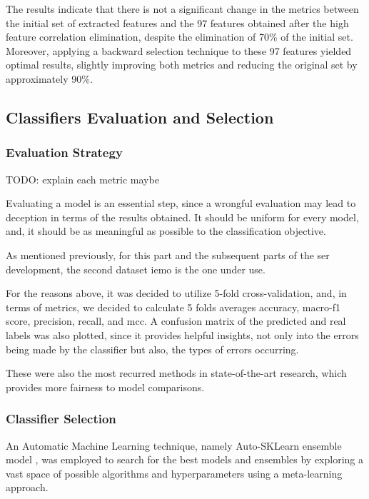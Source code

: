 The results indicate that there is not a significant change in the metrics between the initial set of extracted features and the 97 features obtained after the high feature correlation elimination, despite the elimination of 70\% of the initial set. Moreover, applying a backward selection technique to these 97 features yielded optimal results, slightly improving both metrics and reducing the original set by approximately 90\%.




\subsection{Classifiers Evaluation and Selection}

\subsubsection{Evaluation Strategy}
TODO: explain each metric maybe

Evaluating a model is an essential step, since a wrongful evaluation may lead to deception in terms of the results obtained. It should be uniform for every model, and, it should be as meaningful as possible to the classification objective.

As mentioned previously, for this part and the subsequent parts of the \ac{ser} development, the second dataset \ac{iemo} is the one under use.

For the reasons above, it was decided to utilize 5-fold cross-validation, and, in terms of metrics, we decided to calculate 5 folds averages accuracy, macro-f1 score, precision, recall, and \ac{mcc}. A confusion matrix of the predicted and real labels was also plotted, since it provides helpful insights, not only into the errors being made by the classifier but also, the types of errors occurring.

These were also the most recurred methods in state-of-the-art research, which provides more fairness to model comparisons.

\subsubsection{Classifier Selection}

An Automatic Machine Learning technique, namely Auto-SKLearn ensemble model \cite{feurerneurips15a}, was employed to search for the best models and ensembles by exploring a vast space of possible algorithms and hyperparameters using a meta-learning approach.

